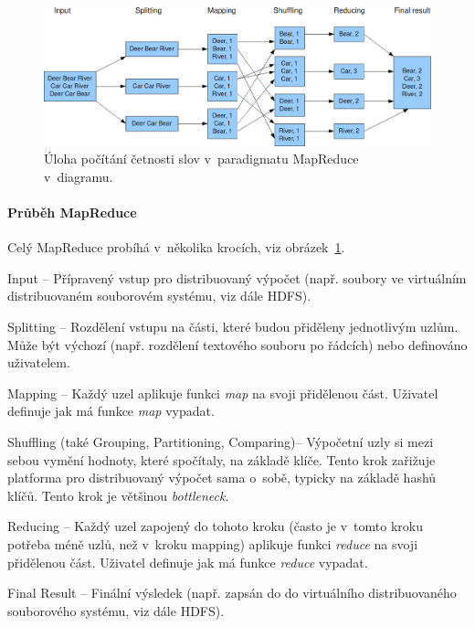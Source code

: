 \begin{figure}[H]
    \centering
    \includegraphics[width=1\linewidth]{map_reduce_example.png}
    \caption{Úloha počítání četnosti slov v~paradigmatu MapReduce v~diagramu.}
    \label{49_map_reduce_example}
\end{figure}

\paragraph*{Průběh MapReduce} Celý MapReduce probíhá v~několika krocích, viz obrázek~\ref{49_map_reduce_example}.
\begin{compactenum}
    \item Input -- Přípravený vstup pro distribuovaný výpočet (např. soubory ve virtuálním distribuovaném souborovém systému, viz dále HDFS).
    \item Splitting -- Rozdělení vstupu na části, které budou přiděleny jednotlivým uzlům. Může být výchozí (např. rozdělení textového souboru po řádcích) nebo definováno uživatelem.
    \item Mapping -- Každý uzel aplikuje funkci \textit{map} na svoji přidělenou část. Uživatel definuje jak má funkce \textit{map} vypadat.
    \item Shuffling (také Grouping, Partitioning, Comparing)-- Výpočetní uzly si mezi sebou vymění hodnoty, které spočítaly, na základě klíče. Tento krok zařižuje platforma pro distribuovaný výpočet sama o~sobě, typicky na základě hashů klíčů. Tento krok je většinou \textit{bottleneck}.
    \item Reducing -- Každý uzel zapojený do tohoto kroku (často je v~tomto kroku potřeba méně uzlů, než v~kroku mapping) aplikuje funkci \textit{reduce} na svoji přidělenou část. Uživatel definuje jak má funkce \textit{reduce} vypadat.
    \item Final Result -- Finální výsledek (např. zapsán do do virtuálního distribuovaného souborového systému, viz dále HDFS).
\end{compactenum}

